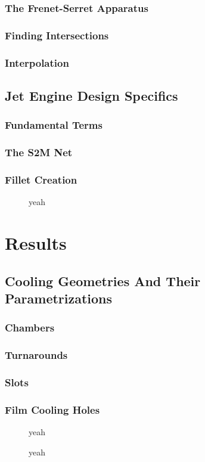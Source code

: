 \documentclass[a4paper, 11pt]{report}
\theoremstyle{definition}
\begin{document}
\subsection{The Frenet-Serret Apparatus}
\subsection{Finding Intersections}
\subsection{Interpolation}

\section{Jet Engine Design Specifics}
\subsection{Fundamental Terms}
\subsection{The S2M Net}
\subsection{Fillet Creation}
\begin{figure}[H]
	\centering
	
	\caption{yeah}
\end{figure}

\chapter{Results}
\section{Cooling Geometries And Their Parametrizations}
\subsection{Chambers}
\subsection{Turnarounds}
\subsection{Slots}
\subsection{Film Cooling Holes}
\begin{figure}[H]
	\centering
	
	\caption{yeah}
\end{figure}
\begin{figure}[H]
	\centering
	
	\caption{yeah}
\end{figure}
\end{document}
